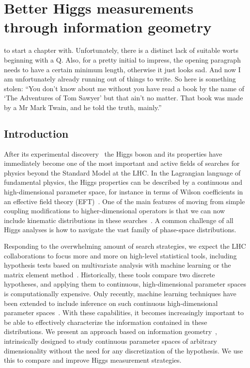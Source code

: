  
\chapter{Better Higgs measurements through information geometry}
\label{chapter:information}

 to start a chapter
with. Unfortunately, there is a distinct lack of suitable worts
beginning with a Q. Also, for a pretty initial to impress, the opening
paragraph needs to have a certain minimum length, otherwise it just
looks sad. And now I am unfortunately already running out of things to
write. So here is something stolen: ``You don't know about me without you
have read a book by the name of `The Adventures of Tom Sawyer' but
that ain't no matter. That book was made by a Mr Mark Twain, and he
told the truth, mainly.''


\section{Introduction}
\label{sec:information_intro}

After its experimental discovery~\cite{higgs,discovery} the Higgs
boson and its properties have immediately become one of the most
important and active fields of searches for physics beyond the
Standard Model at the LHC.  In the Lagrangian language of fundamental
physics, the Higgs properties can be described by a continuous and
high-dimensional parameter space, for instance in terms of Wilson
coefficients in an effective field theory
(EFT)~\cite{eftfoundations,eftorig,eftreviews}. One of the main
features of moving from simple coupling modifications to
higher-dimensional operators is that we can now include kinematic
distributions in these searches~\cite{higgs_fit,yr4}. A common
challenge of all Higgs analyses is how to navigate the vast family of
phase-space distributions.

Responding to the overwhelming amount of search strategies, we expect
the LHC collaborations to focus more and more on high-level
statistical tools, including hypothesis tests based on multivariate
analysis with machine learning or the matrix element
method~\cite{statistics,kyle_review}. Historically, these tools
compare two discrete hypotheses, and applying them to continuous,
high-dimensional parameter spaces is computationally expensive.  Only
recently, machine learning techniques have been extended to include
inference on such continuous high-dimensional parameter
spaces~\cite{machine_learning}.  With these capabilities, it becomes
increasingly important to be able to effectively characterize the
information contained in these distributions.  We present an approach
based on information geometry~\cite{information-geometry},
intrinsically designed to study continuous parameter spaces of
arbitrary dimensionality without the need for any discretization of
the hypothesis. We use this to compare and improve Higgs measurement
strategies.

